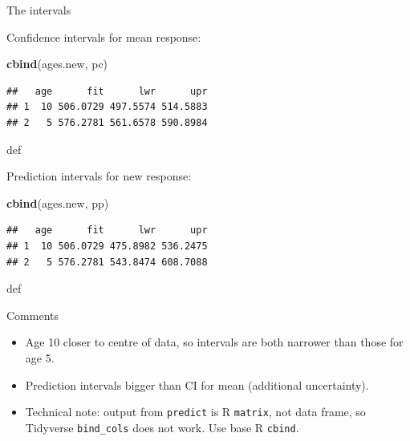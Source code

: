 \documentclass[ignorenonframetext,]{beamer}
\newenvironment{Shaded}{\begin{snugshade}}{\end{snugshade}}
\newcommand{\KeywordTok}[1]{\textcolor[rgb]{0.13,0.29,0.53}{\textbf{#1}}}
\newcommand{\NormalTok}[1]{#1}
\begin{document}
\begin{frame}[fragile]{The intervals}
\protect\hypertarget{the-intervals}{}

Confidence intervals for mean response:

\begin{Shaded}
\begin{Highlighting}[]
\KeywordTok{cbind}\NormalTok{(ages.new, pc)}
\end{Highlighting}
\end{Shaded}

\begin{verbatim}
##   age      fit      lwr      upr
## 1  10 506.0729 497.5574 514.5883
## 2   5 576.2781 561.6578 590.8984
\end{verbatim}

def

Prediction intervals for new response:

\begin{Shaded}
\begin{Highlighting}[]
\KeywordTok{cbind}\NormalTok{(ages.new, pp)}
\end{Highlighting}
\end{Shaded}

\begin{verbatim}
##   age      fit      lwr      upr
## 1  10 506.0729 475.8982 536.2475
## 2   5 576.2781 543.8474 608.7088
\end{verbatim}

def

\end{frame}

\begin{frame}[fragile]{Comments}
\protect\hypertarget{comments}{}

\begin{itemize}
\item
  Age 10 closer to centre of data, so intervals are both narrower than
  those for age 5.
\item
  Prediction intervals bigger than CI for mean (additional uncertainty).
\item
  Technical note: output from \texttt{predict} is R \texttt{matrix}, not
  data frame, so Tidyverse \texttt{bind\_cols} does not work. Use base R
  \texttt{cbind}.
\end{itemize}

\end{frame}
\end{document}
